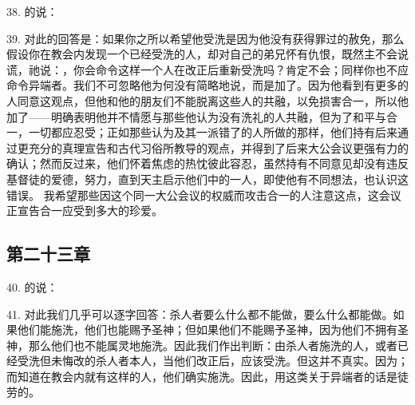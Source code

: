 38. 的说：\par

39. 对此的回答是：如果你之所以希望他受洗是因为他没有获得罪过的赦免，那么假设你在教会内发现一个已经受洗的人，却对自己的弟兄怀有仇恨，既然主不会说谎，祂说：，你会命令这样一个人在改正后重新受洗吗？肯定不会；同样你也不应命令异端者。我们不可忽略他为何没有简略地说，而是加了。因为他看到有更多的人同意这观点，但他和他的朋友们不能脱离这些人的共融，以免损害合一，所以他加了——明确表明他并不情愿与那些他认为没有洗礼的人共融，但为了和平与合一，一切都应忍受；正如那些认为及其一派错了的人所做的那样，他们持有后来通过更充分的真理宣告和古代习俗所教导的观点，并得到了后来大公会议更强有力的确认；然而反过来，他们怀着焦虑的热忱彼此容忍，虽然持有不同意见却没有违反基督徒的爱德，努力，直到天主启示他们中的一人，即使他有不同想法，也认识这错误。 我希望那些因这个同一大公会议的权威而攻击合一的人注意这点，这会议正宣告合一应受到多大的珍爱。\par


\subsection{第二十三章}

40. 的说：\par

41. 对此我们几乎可以逐字回答：杀人者要么什么都不能做，要么什么都能做。如果他们能施洗，他们也能赐予圣神；但如果他们不能赐予圣神，因为他们不拥有圣神，那么他们也不能属灵地施洗。因此我们作出判断：由杀人者施洗的人，或者已经受洗但未悔改的杀人者本人，当他们改正后，应该受洗。但这并不真实。因为；而知道在教会内就有这样的人，他们确实施洗。因此，用这类关于异端者的话是徒劳的。\par


